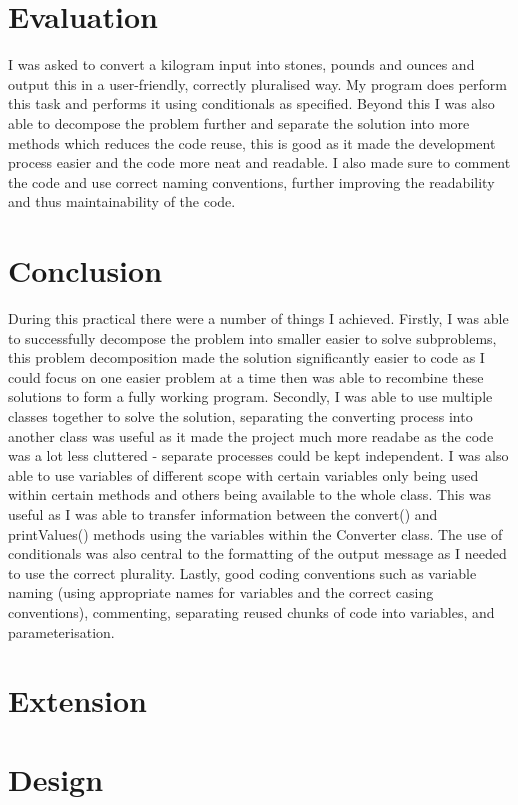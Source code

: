 \documentclass[a4paper]{article}
\begin{document}
\section*{Evaluation}
I was asked to convert a kilogram input into stones, pounds and ounces and output this in a user-friendly, correctly pluralised way. My program does 
perform this task and performs it using conditionals as specified. Beyond this I was also able to decompose the 
problem further and separate the solution into more methods which reduces the code reuse, this is good as it made the development process easier and 
the code more neat and readable. I also made sure to comment the code and use correct naming conventions, further improving the readability and thus 
maintainability of the code.

\section*{Conclusion}
During this practical there were a number of things I achieved. Firstly, I was able to successfully decompose the problem into smaller easier to solve 
subproblems, this problem decomposition made the solution significantly easier to code as I could focus on one easier problem at a time then was able 
to recombine these solutions to form a fully working program. Secondly, I was able to use multiple classes together to solve the solution, separating 
the converting process into another class was useful as it made the project much more readabe as the code was a lot less cluttered - separate 
processes could be kept independent. I was also able to use variables of different scope with certain variables only being used within certain methods 
and others being available to the whole class. This was useful as I was able to transfer information between the convert() and printValues() methods 
using the variables within the Converter class. The use of conditionals was also central to the formatting of the output message as I needed to use 
the correct plurality. Lastly, good coding conventions such as variable naming (using appropriate names for variables and the correct casing 
conventions), commenting, separating reused chunks of code into variables, and parameterisation.

\newpage

\section*{Extension}
\section*{Design}
\end{document}

